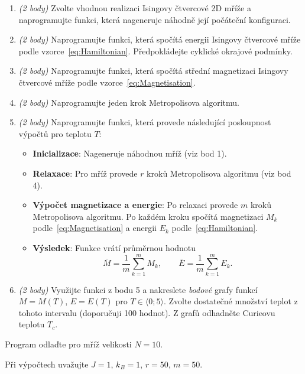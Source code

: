 \documentclass[a4paper,11pt,twoside]{article}
\begin{document}
\begin{enumerate}
    \item \emph{(2 body)} Zvolte vhodnou realizaci Isingovy čtvercové 2D mříže a naprogramujte funkci, která nageneruje náhodně její počáteční konfiguraci.
    
    \item \emph{(2 body)} Naprogramujte funkci, která spočítá energii Isingovy čtvercové mříže podle vzorce~\eqref{eq:Hamiltonian}.
		Předpokládejte cyklické okrajové podmínky.

    \item \emph{(2 body)} Naprogramujte funkci, která spočítá střední magnetizaci Isingovy čtvercové mříže podle vzorce~\eqref{eq:Magnetisation}.
    
    \item \emph{(2 body)} Naprogramujte jeden krok Metropolisova algoritmu.
    
    \item \emph{(2 body)} Naprogramujte funkci, která provede následující posloupnost výpočtů pro teplotu $T$:
    \begin{itemize}
		\item {\bf Inicializace}: Nageneruje náhodnou mříž (viz bod 1).
		\item {\bf Relaxace}: Pro mříž provede $r$ kroků Metropolisova algoritmu (viz bod 4).
		\item {\bf Výpočet magnetizace a energie}: Po relaxaci provede $m$ kroků Metropolisova algoritmu.
			Po každém kroku spočítá magnetizaci $M_k$ podle~\eqref{eq:Magnetisation} a energii $E_k$ podle~\eqref{eq:Hamiltonian}.
		\item {\bf Výsledek}: Funkce vrátí průměrnou hodnotu 
		\begin{equation}
			\bar{M}=\frac{1}{m}\sum_{k=1}^{m}M_{k},\qquad \bar{E}=\frac{1}{m}\sum_{k=1}^{m}E_{k}.
		\end{equation}
	\end{itemize}
	
	\item \emph{(2 body)} Využijte funkci z bodu 5 a nakreslete \emph{bodové} grafy funkcí $M=M(T)$, $E=E(T)$ pro $T\in\langle 0;5\rangle$.
		Zvolte dostatečné množství teplot z tohoto intervalu (doporučuji 100 hodnot).
		Z grafů odhadněte Curieovu teplotu $T_{c}$.

\end{enumerate}

Program odlaďte pro mříž velikosti $N=10$.

Při výpočtech uvažujte $J=1$, $k_{B}=1$, $r=50$, $m=50$.
\end{document}
